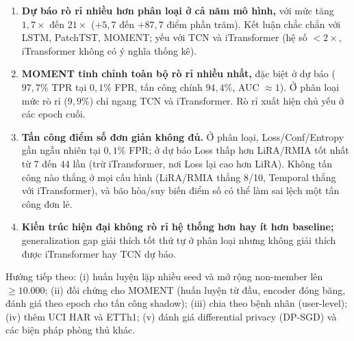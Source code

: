 \documentclass[12pt,a4paper]{report}
\begin{document}
\begin{enumerate}
  \item \textbf{Dự báo rò rỉ nhiều hơn phân loại ở cả năm mô hình,} với mức tăng $1{,}7\times$ đến $21\times$ ($+5{,}7$ đến $+87{,}7$ điểm phần trăm). Kết luận chắc chắn với LSTM, PatchTST, MOMENT; yếu với TCN và iTransformer (hệ số $< 2\times$, iTransformer không có ý nghĩa thống kê).
  \item \textbf{MOMENT tinh chỉnh toàn bộ rò rỉ nhiều nhất,} đặc biệt ở dự báo ($97{,}7\%$ TPR tại $0{,}1\%$ FPR, tấn công chính $94{,}4\%$, AUC $\approx 1$). Ở phân loại mức rò rỉ ($9{,}9\%$) chỉ ngang TCN và iTransformer. Rò rỉ xuất hiện chủ yếu ở các epoch cuối.
  \item \textbf{Tấn công điểm số đơn giản không đủ.} Ở phân loại, Loss/Conf/Entropy gần ngẫu nhiên tại $0{,}1\%$ FPR; ở dự báo Loss thấp hơn LiRA/RMIA tốt nhất từ $7$ đến $44$ lần (trừ iTransformer, nơi Loss lại cao hơn LiRA). Không tấn công nào thắng ở mọi cấu hình (LiRA/RMIA thắng 8/10, Temporal thắng với iTransformer), và bão hòa/suy biến điểm số có thể làm sai lệch một tấn công đơn lẻ.
  \item \textbf{Kiến trúc hiện đại không rò rỉ hệ thống hơn hay ít hơn baseline;} generalization gap giải thích tốt thứ tự ở phân loại nhưng không giải thích được iTransformer hay TCN dự báo.
\end{enumerate}

Hướng tiếp theo: (i) huấn luyện lặp nhiều seed và mở rộng non-member lên $\ge 10.000$; (ii) đối chứng cho MOMENT (huấn luyện từ đầu, encoder đóng băng, đánh giá theo epoch cho tấn công shadow); (iii) chia theo bệnh nhân (user-level); (iv) thêm UCI HAR và ETTh1; (v) đánh giá differential privacy (DP-SGD) và các biện pháp phòng thủ khác.




\end{document}

